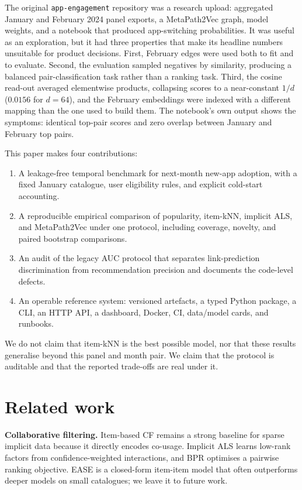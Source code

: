\documentclass[11pt]{article}
\begin{document}
The original \texttt{app-engagement} repository was a research upload: aggregated January and February 2024 panel exports, a MetaPath2Vec graph, model weights, and a notebook that produced app-switching probabilities. It was useful as an exploration, but it had three properties that make its headline numbers unsuitable for product decisions. First, February edges were used both to fit and to evaluate. Second, the evaluation sampled negatives by similarity, producing a balanced pair-classification task rather than a ranking task. Third, the cosine read-out averaged elementwise products, collapsing scores to a near-constant $1/d$ ($0.0156$ for $d=64$), and the February embeddings were indexed with a different mapping than the one used to build them. The notebook's own output shows the symptoms: identical top-pair scores and zero overlap between January and February top pairs.

This paper makes four contributions:

\begin{enumerate}
  \item A leakage-free temporal benchmark for next-month new-app adoption, with a fixed January catalogue, user eligibility rules, and explicit cold-start accounting.
  \item A reproducible empirical comparison of popularity, item-kNN, implicit ALS, and MetaPath2Vec under one protocol, including coverage, novelty, and paired bootstrap comparisons.
  \item An audit of the legacy AUC protocol that separates link-prediction discrimination from recommendation precision and documents the code-level defects.
  \item An operable reference system: versioned artefacts, a typed Python package, a CLI, an HTTP API, a dashboard, Docker, CI, data/model cards, and runbooks.
\end{enumerate}

We do not claim that item-kNN is the best possible model, nor that these results generalise beyond this panel and month pair. We claim that the protocol is auditable and that the reported trade-offs are real under it.

\section{Related work}

\textbf{Collaborative filtering.} Item-based CF \citep{sarwar2001item} remains a strong baseline for sparse implicit data because it directly encodes co-usage. Implicit ALS \citep{hu2008implicit} learns low-rank factors from confidence-weighted interactions, and BPR \citep{rendle2009bpr} optimises a pairwise ranking objective. EASE \citep{steck2019ease} is a closed-form item-item model that often outperforms deeper models on small catalogues; we leave it to future work.
\end{document}
